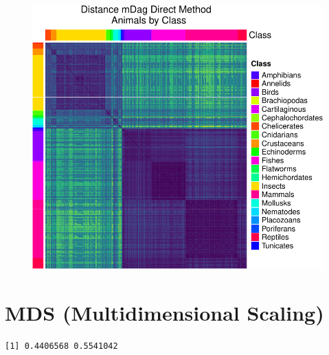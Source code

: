 \documentclass[
  letterpaper,
  DIV=11,
  numbers=noendperiod]{scrreprt}
\newenvironment{Shaded}{\begin{snugshade}}{\end{snugshade}}
\newcommand{\AttributeTok}[1]{\textcolor[rgb]{0.40,0.45,0.13}{#1}}
\newcommand{\CommentTok}[1]{\textcolor[rgb]{0.37,0.37,0.37}{#1}}
\newcommand{\ConstantTok}[1]{\textcolor[rgb]{0.56,0.35,0.01}{#1}}
\newcommand{\DecValTok}[1]{\textcolor[rgb]{0.68,0.00,0.00}{#1}}
\newcommand{\DocumentationTok}[1]{\textcolor[rgb]{0.37,0.37,0.37}{\textit{#1}}}
\newcommand{\FunctionTok}[1]{\textcolor[rgb]{0.28,0.35,0.67}{#1}}
\newcommand{\NormalTok}[1]{\textcolor[rgb]{0.00,0.23,0.31}{#1}}
\newcommand{\OtherTok}[1]{\textcolor[rgb]{0.00,0.23,0.31}{#1}}
\newcommand{\SpecialCharTok}[1]{\textcolor[rgb]{0.37,0.37,0.37}{#1}}
\begin{document}
\begin{figure}[H]

{\centering \includegraphics{./data_medag_20230321_long_report_files/figure-pdf/unnamed-chunk-11-1.pdf}

}

\end{figure}

\hypertarget{mds-multidimensional-scaling}{%
\section{MDS (Multidimensional
Scaling)}\label{mds-multidimensional-scaling}}

\begin{Shaded}
\end{Shaded}

\begin{verbatim}
[1] 0.4406568 0.5541042
\end{verbatim}
\end{document}
